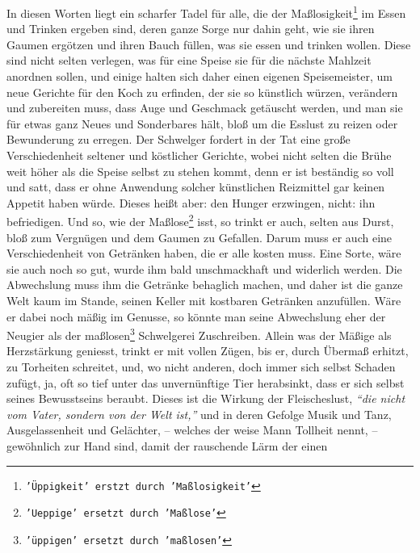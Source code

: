\medskip

In diesen Worten liegt ein scharfer Tadel für alle, die der
Maßlosigkeit\footnote{\texttt{'Üppigkeit' erstzt durch 'Maßlosigkeit'}} im Essen
und Trinken ergeben sind, deren ganze Sorge nur dahin geht, wie sie ihren
Gaumen ergötzen und ihren Bauch füllen, was sie essen und trinken wollen. Diese
sind nicht selten verlegen, was für eine Speise sie für die nächste Mahlzeit
anordnen sollen, und einige halten sich daher einen eigenen
Speisemeister, um
neue Gerichte für den Koch zu erfinden,
der sie so künstlich würzen, verändern
und zubereiten muss, dass Auge und Geschmack getäuscht werden, und man sie für
etwas ganz Neues und Sonderbares hält, bloß um die Esslust zu reizen oder
Bewunderung zu erregen. Der Schwelger fordert in der
Tat eine große
Verschiedenheit seltener und köstlicher Gerichte, wobei nicht selten die Brühe
weit höher als die Speise selbst zu stehen kommt, denn er ist beständig so voll
und satt, dass er ohne Anwendung solcher künstlichen
Reizmittel gar keinen
Appetit haben würde. Dieses heißt aber: den Hunger erzwingen, nicht: ihn
befriedigen. Und so, wie der Maßlose\footnote{\texttt{'Ueppige' ersetzt durch
'Maßlose'}} isst,
so trinkt er auch, selten aus Durst,
bloß zum Vergnügen und dem Gaumen zu Gefallen. Darum muss er
auch eine
Verschiedenheit von Getränken haben, die er alle kosten
muss. Eine Sorte, wäre
sie auch noch so gut, wurde ihm bald unschmackhaft und widerlich werden. Die
Abwechslung muss ihm die Getränke behaglich machen, und daher ist die ganze Welt
kaum im Stande, seinen Keller mit kostbaren Getränken anzufüllen. Wäre er dabei
noch mäßig im Genusse, so könnte man seine Abwechslung eher der Neugier als der
maßlosen\footnote{\texttt{'üppigen' ersetzt durch 'maßlosen'}} Schwelgerei
Zuschreiben. Allein was
der Mäßige als Herzstärkung
geniesst, trinkt er mit vollen Zügen, bis er, durch
Übermaß erhitzt, zu
Torheiten schreitet, und, wo nicht anderen, doch immer sich selbst Schaden
zufügt, ja, oft so tief unter das unvernünftige Tier herabsinkt, dass er sich
selbst seines Bewusstseins beraubt. Dieses ist die Wirkung der Fleischeslust,
\textit{"`die nicht vom Vater, sondern von der Welt ist,"'} und in deren Gefolge
Musik
und Tanz, Ausgelassenheit und Gelächter, -- welches der weise Mann
Tollheit
nennt, -- gewöhnlich zur Hand sind, damit der rauschende Lärm der einen
